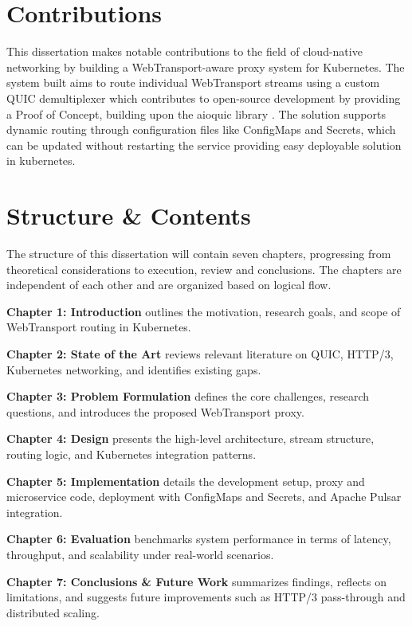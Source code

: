 \section{Contributions}

This dissertation makes notable contributions to the field of cloud-native networking by building a WebTransport-aware proxy system for Kubernetes. The system built aims to route individual WebTransport streams using a custom QUIC demultiplexer which contributes to open-source development by providing a Proof of Concept, building upon the aioquic library \cite{aioquic-repo}. The solution supports dynamic routing through configuration files like ConfigMaps and Secrets, which can be updated without restarting the service providing easy deployable solution in kubernetes.


\section{Structure \& Contents}

The structure of this dissertation will contain seven chapters, progressing from theoretical considerations to execution, review and conclusions. The chapters are independent of each other and are organized based on logical flow.

\textbf{Chapter 1: Introduction} outlines the motivation, research goals, and scope of WebTransport routing in Kubernetes.

\textbf{Chapter 2: State of the Art} reviews relevant literature on QUIC, HTTP/3, Kubernetes networking, and identifies existing gaps.

\textbf{Chapter 3: Problem Formulation} defines the core challenges, research questions, and introduces the proposed WebTransport proxy.

\textbf{Chapter 4: Design} presents the high-level architecture, stream structure, routing logic, and Kubernetes integration patterns.

\textbf{Chapter 5: Implementation} details the development setup, proxy and microservice code, deployment with ConfigMaps and Secrets, and Apache Pulsar integration.

\textbf{Chapter 6: Evaluation} benchmarks system performance in terms of latency, throughput, and scalability under real-world scenarios.

\textbf{Chapter 7: Conclusions \& Future Work} summarizes findings, reflects on limitations, and suggests future improvements such as HTTP/3 pass-through and distributed scaling.
